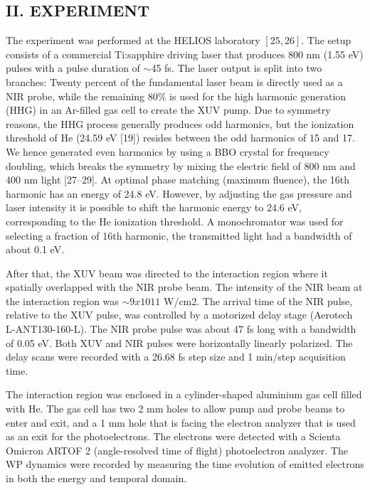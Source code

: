 \documentclass[7pt]{article}
\begin{document}
\begin{multicols}{2}
\small{}
    \begin{center}
        \section*{\normalsize{II. EXPERIMENT}}
    \end{center}
The experiment was performed at the HELIOS laboratory $[25,26]$. The setup consists of a commercial Ti:sapphire driving laser that produces 800 nm (1.55 eV) pulses with a
pulse duration of $\sim$45 fs. The laser output is split into two branches: Twenty percent of the fundamental laser beam is directly used as a NIR probe, while the remaining $80\%$ is used for the high harmonic generation (HHG) in an Ar-filled
gas cell to create the XUV pump. Due to symmetry reasons, the HHG process generally produces odd harmonics, but the ionization threshold of He (24.59 eV [19]) resides between the odd harmonics of 15 and 17. We hence generated even harmonics by using a BBO crystal for frequency doubling, which breaks the symmetry by mixing the electric field of 800 nm and 400 nm light [27–29]. At optimal phase matching (maximum fluence), the 16th harmonic has an energy of 24.8 eV. However, by adjusting the gas pressure and laser
intensity it is possible to shift the harmonic energy to 24.6 eV, corresponding to the He ionization threshold. A monochromator was used for selecting a fraction of 16th harmonic, the transmitted light had a bandwidth of about 0.1 eV.

After that, the XUV beam was directed to the interaction region where it spatially overlapped with the NIR probe beam. The intensity of the NIR beam at the interaction region was $\sim 9 x 1011$ W/cm2. The arrival time of the NIR pulse, relative to the XUV pulse, was controlled by a motorized delay stage (Aerotech L-ANT130-160-L). The NIR probe pulse was about 47 fs long with a bandwidth of 0.05 eV. Both XUV and NIR pulses were horizontally linearly polarized. The delay scans were recorded with a 26.68 fs step size and 1 min/step acquisition time.

The interaction region was enclosed in a cylinder-shaped aluminium gas cell filled with He. The gas cell has two 2 mm holes to allow pump and probe beams to enter and exit, and a 1 mm hole that is facing the electron analyzer that is used as an exit for the photoelectrons. The electrons were detected with a Scienta Omicron ARTOF 2 (angle-resolved time of flight) photoelectron analyzer. The WP dynamics were recorded by
measuring the time evolution of emitted electrons in both the energy and temporal domain.\\



\end{multicols}
\end{document}
